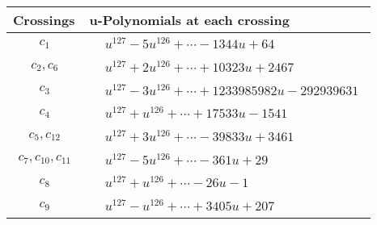 \documentclass[1p]{elsarticle_modified}
\theoremstyle{definition}
\begin{document}
\begin{tabular}{m{50pt}|m{274pt}}
Crossings & \hspace{64pt}u-Polynomials at each crossing \\
\hline $$\begin{aligned}c_{1}\end{aligned}$$&$\begin{aligned}
&u^{127}-5 u^{126}+\cdots-1344 u+64
\end{aligned}$\\
\hline $$\begin{aligned}c_{2},c_{6}\end{aligned}$$&$\begin{aligned}
&u^{127}+2 u^{126}+\cdots+10323 u+2467
\end{aligned}$\\
\hline $$\begin{aligned}c_{3}\end{aligned}$$&$\begin{aligned}
&u^{127}-3 u^{126}+\cdots+1233985982 u-292939631
\end{aligned}$\\
\hline $$\begin{aligned}c_{4}\end{aligned}$$&$\begin{aligned}
&u^{127}+u^{126}+\cdots+17533 u-1541
\end{aligned}$\\
\hline $$\begin{aligned}c_{5},c_{12}\end{aligned}$$&$\begin{aligned}
&u^{127}+3 u^{126}+\cdots-39833 u+3461
\end{aligned}$\\
\hline $$\begin{aligned}c_{7},c_{10},c_{11}\end{aligned}$$&$\begin{aligned}
&u^{127}-5 u^{126}+\cdots-361 u+29
\end{aligned}$\\
\hline $$\begin{aligned}c_{8}\end{aligned}$$&$\begin{aligned}
&u^{127}+u^{126}+\cdots-26 u-1
\end{aligned}$\\
\hline $$\begin{aligned}c_{9}\end{aligned}$$&$\begin{aligned}
&u^{127}- u^{126}+\cdots+3405 u+207
\end{aligned}$\\
\hline
\end{tabular}\\~\\
\end{document}
